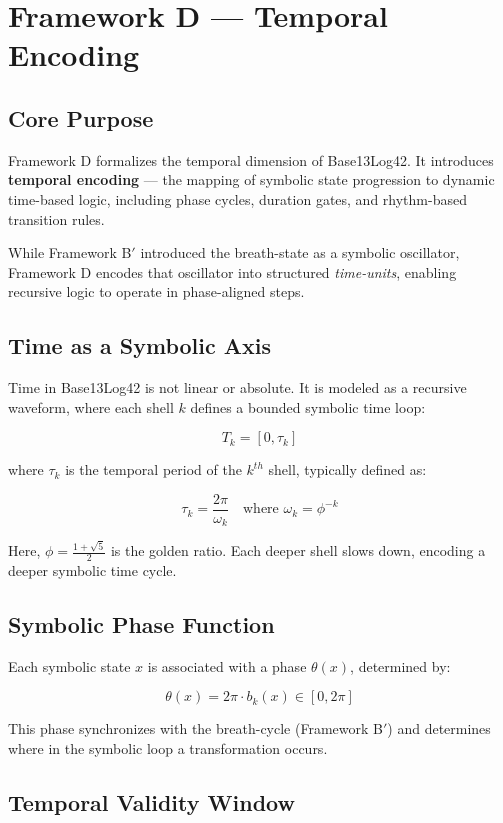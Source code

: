 \section*{Framework D — Temporal Encoding}

\subsection*{Core Purpose}

Framework D formalizes the temporal dimension of Base13Log42. It introduces \textbf{temporal encoding} — the mapping of symbolic state progression to dynamic time-based logic, including phase cycles, duration gates, and rhythm-based transition rules.

While Framework B$'$ introduced the breath-state as a symbolic oscillator, Framework D encodes that oscillator into structured \emph{time-units}, enabling recursive logic to operate in phase-aligned steps.

\subsection*{Time as a Symbolic Axis}

Time in Base13Log42 is not linear or absolute. It is modeled as a recursive waveform, where each shell $k$ defines a bounded symbolic time loop:

\[
T_k = [0, \tau_k]
\]

where $\tau_k$ is the temporal period of the $k^{th}$ shell, typically defined as:

\[
\tau_k = \frac{2\pi}{\omega_k}
\quad \text{where } \omega_k = \phi^{-k}
\]

Here, $\phi = \frac{1 + \sqrt{5}}{2}$ is the golden ratio. Each deeper shell slows down, encoding a deeper symbolic time cycle.

\subsection*{Symbolic Phase Function}

Each symbolic state $x$ is associated with a phase $\theta(x)$, determined by:

\[
\theta(x) = 2\pi \cdot b_k(x) \in [0, 2\pi]
\]

This phase synchronizes with the breath-cycle (Framework B$'$) and determines where in the symbolic loop a transformation occurs.

\subsection*{Temporal Validity Window}

